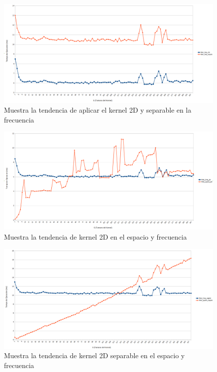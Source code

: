 \documentclass[11 pt,oneside]{article}
\begin{document}
\begin{figure}[H]
\centering
\includegraphics[width=17cm]{freq}
\caption{Muestra la tendencia de aplicar el kernel 2D y separable en la frecuencia} \label{fig:2d}
\end{figure} 

\begin{figure}[H]
\centering
\includegraphics[width=17cm]{2d}
\caption{Muestra la tendencia de kernel 2D en el espacio y frecuencia} \label{fig:2d}
\end{figure} 

\begin{figure}[H]
\centering
\includegraphics[width=17cm]{sep}
\caption{Muestra la tendencia de kernel 2D separable en el espacio y frecuencia} \label{fig:2d}
\end{figure} 
\end{document}
